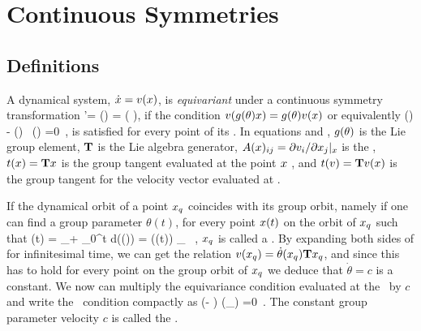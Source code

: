 \section{Continuous Symmetries}
\label{s:symm}

\subsection{Definitions}

A dynamical system, $\dot{x}=v(x)$, is \emph{equivariant} under a continuous
symmetry transformation
\beq
	\ssp'= \LieEl (\theta) \ssp = \exp\left( \theta \Lg\right)\ssp,
if the condition
$v(g (\theta) x ) = g (\theta) v( x ) $
or equivalently 
\beq
  \groupTan(\vel)  - \Mvar(\ssp) \, \groupTan(\ssp) =0
  \,,
is satisfied for every point of its \statesp . In equations 
and , $g (\theta)$ is the Lie group element, $\mathbf{T}$
is the Lie algebra generator, $A(x)_{ij} = {\partial v_i}/{\partial x_j} |_x$
is the \stabmat , $ t(x) = \mathbf{T} x $ is the group tangent evaluated
at the point $x$ , and $ t(v) = \mathbf{T} v(x) $ is the group
tangent for the velocity vector evaluated at \ssp.

\label{s:relatives}

If the dynamical orbit of a point $x_q$ coincides with its group
orbit, namely if one can find a group parameter $\theta (t)$, for every point $x (t)$
on the orbit of $x_q$ such that
\beq
  \ssp (t) = \ssp_\stagn + \int_0^t d\tau \vel(\ssp (\tau)) = \LieEl (\theta (t)) \ssp_\stagn
  \, ,
 $x_q$ is called a \emph{ \reqv }. By expanding both sides of 
for infinitesimal time, we can get the relation
$v(x_q) = \dot{\theta}(x_q) \mathbf{T} x_q$,
and since this has to hold for every point on the group orbit of $x_q$
we deduce that $\dot{\theta} = c$ is a constant. We now can multiply the equivariance
condition  evaluated at the \reqv\ by $c$ and write the
\reqv\ condition compactly as
\beq
(\velRel \Lg - \Mvar ) \vel (\ssp_\stagn) =0
\,.
The constant group parameter velocity $c$  is called the \phaseVel .

